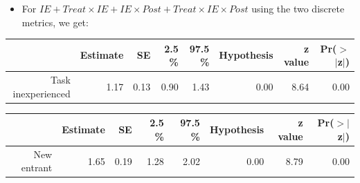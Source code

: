 \documentclass[
]{article}
\providecommand{\tightlist}{%
  \setlength{\itemsep}{0pt}\setlength{\parskip}{0pt}}
\begin{document}
\begin{itemize}
\tightlist
\item
  For
  \(IE + Treat \times IE + IE \times Post + Treat \times IE \times Post\)
  using the two discrete metrics, we get:
\end{itemize}

\begin{table}[ht]
\centering
\begin{tabular}{rrrrrrrr}
  \hline
 & Estimate & SE & 2.5 \% & 97.5 \% & Hypothesis & z value & Pr($>$$|$z$|$) \\ 
  \hline
Task inexperienced & 1.17 & 0.13 & 0.90 & 1.43 & 0.00 & 8.64 & 0.00 \\ 
   \hline
\end{tabular}
\end{table}
\begin{table}[ht]
\centering
\begin{tabular}{rrrrrrrr}
  \hline
 & Estimate & SE & 2.5 \% & 97.5 \% & Hypothesis & z value & Pr($>$$|$z$|$) \\ 
  \hline
New entrant & 1.65 & 0.19 & 1.28 & 2.02 & 0.00 & 8.79 & 0.00 \\ 
   \hline
\end{tabular}
\end{table}
\end{document}
